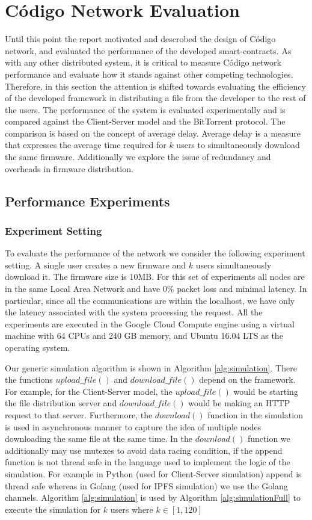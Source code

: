 
\chapter{Código Network Evaluation}\label{chap:CNeval}{

Until this point the report motivated and descrobed the design of Código network, and evaluated the performance of the developed smart-contracts. As with any other distributed system, it is critical to measure Código network performance and evaluate how it stands against other competing technologies. Therefore, in this section the attention is shifted towards evaluating the efficiency of the developed framework in distributing a file from the developer to the rest of the users. The performance of the system is evaluated experimentally and is compared against the Client-Server model and the BitTorrent protocol. The comparison is based on the concept of average delay. Average delay is a measure that expresses the average time required for $k$ users to simultaneously download the same firmware. Additionally we explore the issue of redundancy and overheads in firmware distribution.

\section{Performance Experiments}{
\subsection{Experiment Setting}{

To evaluate the performance of the network we consider the following experiment setting. A single user creates a new firmware and $k$ users simultaneously download it. The firmware size is 10MB.  For this set of experiments all nodes are in the same Local Area Network and have 0\% packet loss and minimal latency. In particular, since all the communications are within the localhost, we have only the latency associated with the system processing the request. All the experiments are executed in the Google Cloud Compute engine using a virtual machine with 64 CPUs and 240 GB memory, and Ubuntu 16.04 LTS as the operating system.

Our generic simulation algorithm is shown in Algorithm \ref{alg:simulation}. There the functions $upload\_file()$ and $download\_file()$  depend on the framework. For example, for the Client-Server model, the $upload\_file()$ would be starting the file distribution server and $download\_file()$ would be making an HTTP request to that server. Furthermore, the $download()$ function in the simulation is used in asynchronous manner to capture the idea of multiple nodes downloading the same file at the same time. In the $download()$ function we additionally may use mutexes to avoid data racing condition, if the append function is not thread safe in the language used to implement the logic of the simulation. For example in Python (used for Client-Server simulation) append is thread safe whereas in Golang (used for IPFS simulation) we use the Golang channels. Algorithm \ref{alg:simulation} is used by Algorithm \ref{alg:simulationFull} to execute the simulation for $k$ users where $k \in [1,120]$ 

}}}
